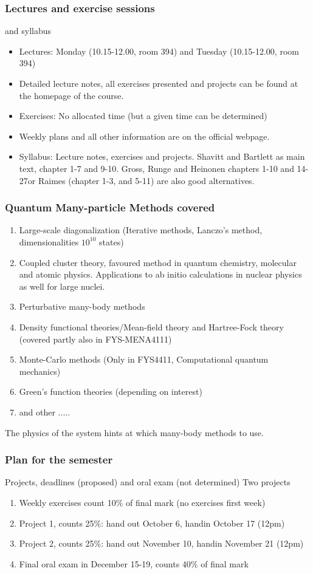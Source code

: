 \frame
{
  \frametitle{Lectures and exercise sessions}
  \begin{block}{and syllabus}
\begin{itemize}
\item Lectures: Monday (10.15-12.00, room 394) and Tuesday (10.15-12.00, room 394)
       \item Detailed lecture notes, all exercises presented and projects
can be found at the homepage of the course.
       \item Exercises: No allocated time (but a given time can be determined)
       \item Weekly plans and all other information are on the official webpage.
\item Syllabus: Lecture notes, exercises and projects. Shavitt and Bartlett as main text, chapter 1-7 and 9-10. Gross, Runge and Heinonen chapters 1-10 and 14-27or  Raimes (chapter 1-3, and 5-11) are also good alternatives.
\end{itemize}
  \end{block}
}


\frame
{
  \frametitle{Quantum Many-particle Methods covered}
\begin{small}
{\scriptsize
\begin{enumerate}
\item Large-scale diagonalization (Iterative methods, Lanczo's method, dimensionalities 
$10^{10}$ states)
\item Coupled cluster theory, favoured method in quantum chemistry, 
molecular and atomic physics. Applications to ab initio calculations in 
nuclear physics as well for large nuclei.
\item Perturbative many-body methods 
\item Density functional theories/Mean-field theory and Hartree-Fock theory (covered partly also in FYS-MENA4111)
\item Monte-Carlo methods (Only in FYS4411, Computational quantum mechanics)
\item Green's function theories (depending on interest)
\item and other .....
\end{enumerate}
The physics of the system hints at which many-body methods to use.
}
\end{small}
}




\frame
{
  \frametitle{Plan for the semester}
  \begin{block}{Projects, deadlines (proposed) and oral exam (not determined)}
Two projects
\begin{enumerate}
\item Weekly exercises count 10\% of final mark (no exercises  first week)
\item Project 1, counts 25\%: hand out October 6, handin October 17 (12pm)
\item  Project 2, counts 25\%: hand out November 10, handin November 21 (12pm)
\item Final oral exam in December 15-19, counts 40\% of final mark
\end{enumerate}
  \end{block}
} 


